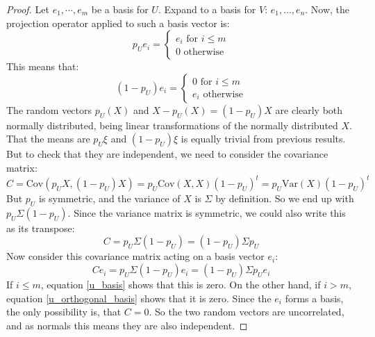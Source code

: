 \documentclass[12pt, a4paper]{article}
\numberwithin{equation}{section}
\begin{document}
\begin{proof}
Let $e_1,\cdots,e_m$ be a basis for $U$. Expand to a basis for $V$: $e_1,\dots,e_n$. Now, the projection operator applied to such a basis vector is:
\begin{equation}
\label{u_basis}
p_U e_i=
\begin{cases}
e_i\textrm{ for } i\le m \\
0\textrm{ otherwise}
\end{cases}
\end{equation}
This means that:
\begin{equation}
\label{u_orthogonal_basis}
(1-p_U)e_i=
\begin{cases}
0\textrm{ for } i\le m \\
e_i\textrm{ otherwise}
\end{cases}
\end{equation}
The random vectors $p_U(X)$ and $X-p_U(X)=(1-p_U)X$ are clearly both normally distributed, being linear transformations of the normally distributed $X$. That the means are $p_U\xi$ and $(1-p_U)\xi$ is equally trivial from previous results. But to check that they are independent, we need to consider the covariance matrix:
\begin{equation}
C=\textrm{Cov}(p_U X,(1-p_U)X)=p_U\textrm{Cov}(X,X)(1-p_U)^t=p_U\textrm{Var}(X)(1-p_U)^t
\end{equation}
But $p_U$ is symmetric, and the variance of $X$ is $\Sigma$ by definition. So we end up with $p_U\Sigma(1-p_U)$. Since the variance matrix is symmetric, we could also write this as its transpose:
\begin{equation}
C=p_U\Sigma(1-p_U)=(1-p_U)\Sigma p_U
\end{equation}
Now consider this covariance matrix acting on a basis vector $e_i$:
\begin{equation}
C e_i=p_U\Sigma(1-p_U)e_i=(1-p_U)\Sigma p_U e_i
\end{equation}
If $i\le m$, equation \ref{u_basis} shows that this is zero. On the other hand, if $i>m$, equation \ref{u_orthogonal_basis} shows that it is zero. Since the $e_i$ forms a basis, the only possibility is, that $C=0$. So the two random vectors are uncorrelated, and as normals this means they are also independent.


\end{proof}
\end{document}
